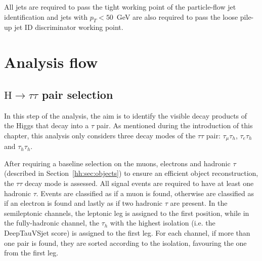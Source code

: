\documentclass[../main.tex]{subfiles}
\begin{document}
All jets are required to pass the tight working point of the particle-flow jet identification and jets with $p_T<50$~GeV are also required to pass the loose pile-up jet ID discriminator working point.


\section{Analysis flow}

\subsection{$\text{H}\to\tau\tau$ pair selection}

In this step of the analysis, the aim is to identify the visible decay products of the Higgs that decay into a $\tau$ pair. As mentioned during the introduction of this chapter, this analysis only considers three decay modes of the $\tau\tau$ pair: $\tau_\mu\tau_h$, $\tau_e\tau_h$ and $\tau_h\tau_h$. 

After requiring a baseline selection on the muons, electrons and hadronic $\tau$ (described in Section~\ref{hh:sec:objects}) to ensure an efficient object reconstruction, the $\tau\tau$ decay mode is assessed. All signal events are required to have at least one hadronic $\tau$. Events are classified as \taumu\tauh{} if a muon is found, otherwise are classified as \taue\tauh{} if an electron is found and lastly as \tauh\tauh{} if two hadronic $\tau$ are present. In the semileptonic channels, the leptonic leg is assigned to the first position, while in the fully-hadronic channel, the $\tau_h$ with the highest isolation (i.e. the DeepTauVSjet score) is assigned to the first leg. For each channel, if more than one pair is found, they are sorted according to the isolation, favouring the one from the first leg.
\end{document}
